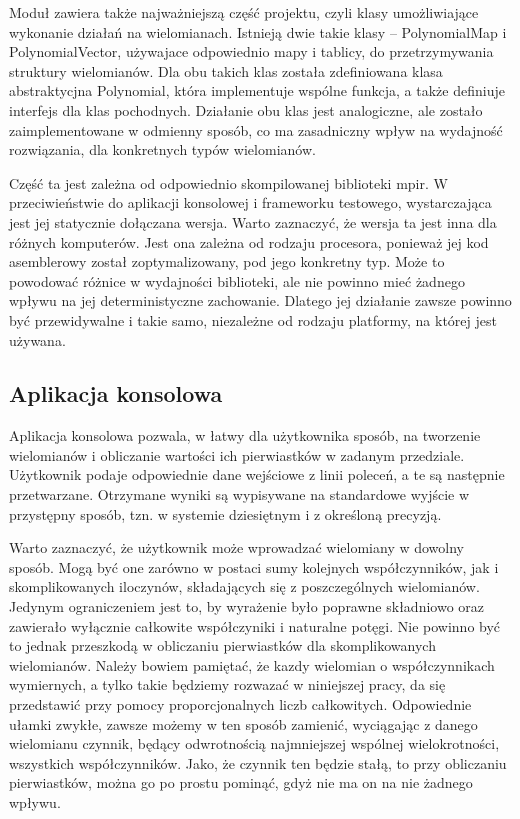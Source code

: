 \documentclass[oneside,a4paper]{book}
\begin{document}
	Moduł zawiera także najważniejszą część projektu, czyli klasy umożliwiające wykonanie działań na wielomianach. Istnieją dwie takie klasy -- PolynomialMap i PolynomialVector, używajace odpowiednio mapy i tablicy, do przetrzymywania struktury wielomianów. Dla obu takich klas została zdefiniowana klasa abstraktycjna Polynomial, która implementuje wspólne funkcja, a także definiuje interfejs dla klas pochodnych. Działanie obu klas jest analogiczne, ale zostało zaimplementowane w odmienny sposób, co ma zasadniczny wpływ na wydajność rozwiązania, dla konkretnych typów wielomianów.
	
	Część ta jest zależna od odpowiednio skompilowanej biblioteki mpir. W przeciwieństwie do aplikacji konsolowej i frameworku testowego, wystarczająca jest jej statycznie dołączana wersja. Warto zaznaczyć, że wersja ta jest inna dla różnych komputerów. Jest ona zależna od rodzaju procesora, ponieważ jej kod asemblerowy został zoptymalizowany, pod jego konkretny typ. Może to powodować różnice w wydajności biblioteki, ale nie powinno mieć żadnego wpływu na jej deterministyczne zachowanie. Dlatego jej działanie zawsze powinno być przewidywalne i takie samo, niezależne od rodzaju platformy, na której jest używana.
	
	\subsection{Aplikacja konsolowa}
	
	Aplikacja konsolowa pozwala, w łatwy dla użytkownika sposób, na tworzenie wielomianów i obliczanie wartości ich pierwiastków w zadanym przedziale. Użytkownik podaje odpowiednie dane wejściowe z linii poleceń, a te są następnie przetwarzane. Otrzymane wyniki są wypisywane na standardowe wyjście w przystępny sposób, tzn. w systemie dziesiętnym i z określoną precyzją.
	
	Warto zaznaczyć, że użytkownik może wprowadzać wielomiany w dowolny sposób. Mogą być one zarówno w postaci sumy kolejnych współczynników, jak i skomplikowanych iloczynów, składających się z poszczególnych wielomianów. Jedynym ograniczeniem jest to, by wyrażenie było poprawne składniowo oraz zawierało wyłącznie całkowite współczyniki i naturalne potęgi. Nie powinno być to jednak przeszkodą w obliczaniu pierwiastków dla skomplikowanych wielomianów. Należy bowiem pamiętać, że kazdy wielomian o współczynnikach wymiernych, a tylko takie będziemy rozwazać w niniejszej pracy, da się przedstawić przy pomocy proporcjonalnych liczb całkowitych. Odpowiednie ułamki zwykłe, zawsze możemy w ten sposób zamienić, wyciągając z danego wielomianu czynnik, będący odwrotnością najmniejszej wspólnej wielokrotności, wszystkich współczynników. Jako, że czynnik ten będzie stałą, to przy obliczaniu pierwiastków, można go po prostu pominąć, gdyż nie ma on na nie żadnego wpływu.
	
\end{document}
